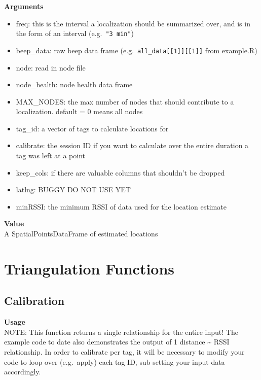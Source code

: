 \documentclass[
]{book}
\providecommand{\tightlist}{%
  \setlength{\itemsep}{0pt}\setlength{\parskip}{0pt}}
\begin{document}
\textbf{Arguments}

\begin{itemize}
\tightlist
\item
  freq: this is the interval a localization should be summarized over, and is in the form of an interval (e.g.~\texttt{"3\ min"})\\
\item
  beep\_data: raw beep data frame (e.g.~\texttt{all\_data{[}{[}1{]}{]}{[}{[}1{]}{]}} from example.R)\\
\item
  node: read in node file\\
\item
  node\_health: node health data frame
\item
  MAX\_NODES: the max number of nodes that should contribute to a localization. default = 0 means all nodes
\item
  tag\_id: a vector of tags to calculate locations for
\item
  calibrate: the session ID if you want to calculate over the entire duration a tag was left at a point
\item
  keep\_cols: if there are valuable columns that shouldn't be dropped
\item
  latlng: BUGGY DO NOT USE YET
\item
  minRSSI: the minimum RSSI of data used for the location estimate
\end{itemize}

\textbf{Value}\\
A SpatialPointsDataFrame of estimated locations

\hypertarget{triangulation-functions}{%
\section{Triangulation Functions}\label{triangulation-functions}}

\hypertarget{calibration-1}{%
\subsection{Calibration}\label{calibration-1}}

\textbf{Usage}\\
NOTE: This function returns a single relationship for the entire input! The example code to date also demonstrates the output of 1 distance \textasciitilde{} RSSI relationship. In order to calibrate per tag, it will be necessary to modify your code to loop over (e.g.~apply) each tag ID, sub-setting your input data accordingly.
\end{document}
